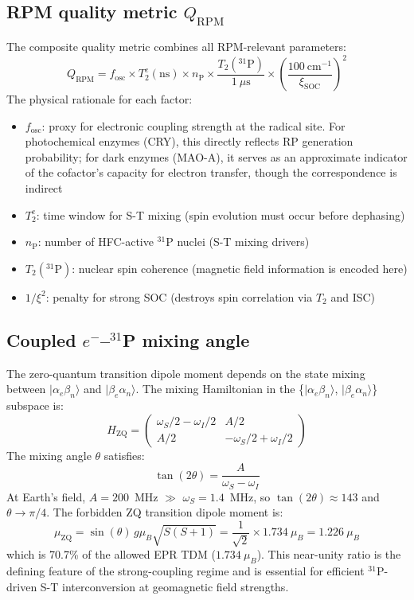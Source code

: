 \documentclass[11pt]{article}
\begin{document}
\subsection{RPM quality metric $Q_\mathrm{RPM}$}

The composite quality metric combines all RPM-relevant parameters:
\begin{equation}
Q_\mathrm{RPM} = f_\mathrm{osc} \times T_2^e(\mathrm{ns}) \times n_\mathrm{P} \times \frac{T_2(^{31}\mathrm{P})}{1~\mu\mathrm{s}} \times \left(\frac{100~\mathrm{cm}^{-1}}{\xi_\mathrm{SOC}}\right)^2
\label{eq:SQ}
\end{equation}
The physical rationale for each factor:
\begin{itemize}
\item $f_\mathrm{osc}$: proxy for electronic coupling strength at the radical site. For photochemical enzymes (CRY), this directly reflects RP generation probability; for dark enzymes (MAO-A), it serves as an approximate indicator of the cofactor's capacity for electron transfer, though the correspondence is indirect
\item $T_2^e$: time window for S-T mixing (spin evolution must occur before dephasing)
\item $n_\mathrm{P}$: number of HFC-active $^{31}$P nuclei (S-T mixing drivers)
\item $T_2(^{31}\mathrm{P})$: nuclear spin coherence (magnetic field information is encoded here)
\item $1/\xi^2$: penalty for strong SOC (destroys spin correlation via $T_2$ and ISC)
\end{itemize}

\subsection{Coupled $e^-$--$^{31}$P mixing angle}

The zero-quantum transition dipole moment depends on the state mixing between $|\alpha_e\beta_n\rangle$ and $|\beta_e\alpha_n\rangle$. The mixing Hamiltonian in the \{$|\alpha_e\beta_n\rangle$, $|\beta_e\alpha_n\rangle$\} subspace is:
\begin{equation}
H_\mathrm{ZQ} = \begin{pmatrix} \omega_S/2 - \omega_I/2 & A/2 \\ A/2 & -\omega_S/2 + \omega_I/2 \end{pmatrix}
\end{equation}
The mixing angle $\theta$ satisfies:
\begin{equation}
\tan(2\theta) = \frac{A}{\omega_S - \omega_I}
\end{equation}
At Earth's field, $A = 200$~MHz $\gg$ $\omega_S = 1.4$~MHz, so $\tan(2\theta) \approx 143$ and $\theta \rightarrow \pi/4$. The forbidden ZQ transition dipole moment is:
\begin{equation}
\mu_\mathrm{ZQ} = \sin(\theta)\,g\mu_B\sqrt{S(S+1)} = \frac{1}{\sqrt{2}} \times 1.734~\mu_B = 1.226~\mu_B
\end{equation}
which is 70.7\% of the allowed EPR TDM ($1.734~\mu_B$). This near-unity ratio is the defining feature of the strong-coupling regime and is essential for efficient $^{31}$P-driven S-T interconversion at geomagnetic field strengths.
\end{document}
